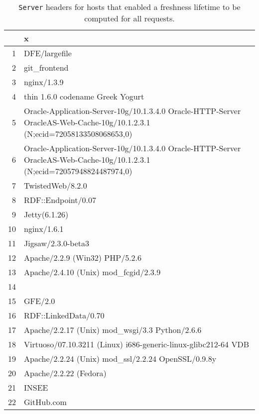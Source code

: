 \documentclass{article}
\newcommand{\httph}[1]{\texttt{#1}}
\begin{document}
\begin{table}[ht]
  \caption{\httph{Server} headers for hosts that enabled a freshness
    lifetime to be computed for all requests.}\label{tab:servers}
\begin{center}
\begin{tabular}{rl}
  \hline
 & x \\ 
  \hline
1 & DFE/largefile \\ 
  2 & git\_frontend \\ 
  3 & nginx/1.3.9 \\ 
  4 & thin 1.6.0 codename Greek Yogurt \\ 
  5 & Oracle-Application-Server-10g/10.1.3.4.0 Oracle-HTTP-Server OracleAS-Web-Cache-10g/10.1.2.3.1 (N;ecid=72058133508068653,0) \\ 
  6 & Oracle-Application-Server-10g/10.1.3.4.0 Oracle-HTTP-Server OracleAS-Web-Cache-10g/10.1.2.3.1 (N;ecid=72057948824487974,0) \\ 
  7 & TwistedWeb/8.2.0 \\ 
  8 & RDF::Endpoint/0.07 \\ 
  9 & Jetty(6.1.26) \\ 
  10 & nginx/1.6.1 \\ 
  11 & Jigsaw/2.3.0-beta3 \\ 
  12 & Apache/2.2.9 (Win32) PHP/5.2.6 \\ 
  13 & Apache/2.4.10 (Unix) mod\_fcgid/2.3.9 \\ 
  14 &  \\ 
  15 & GFE/2.0 \\ 
  16 & RDF::LinkedData/0.70 \\ 
  17 & Apache/2.2.17 (Unix) mod\_wsgi/3.3 Python/2.6.6 \\ 
  18 & Virtuoso/07.10.3211 (Linux) i686-generic-linux-glibc212-64  VDB \\ 
  19 & Apache/2.2.24 (Unix) mod\_ssl/2.2.24 OpenSSL/0.9.8y \\ 
  20 & Apache/2.2.22 (Fedora) \\ 
  21 & INSEE \\ 
  22 & GitHub.com \\ 
   \hline
\end{tabular}
\end{center}
\end{table}
\end{document}
